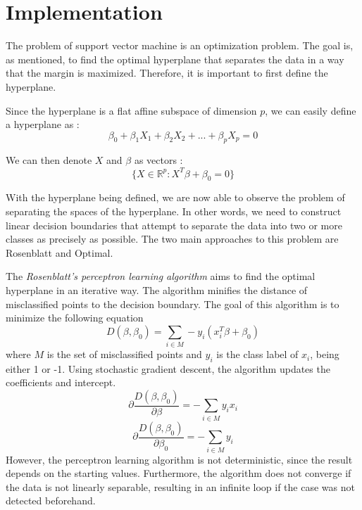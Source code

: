 \section{Implementation}
The problem of support vector machine is an optimization problem. The goal is, as mentioned, 
to find the optimal hyperplane that separates the data in a way that the margin is maximized.
Therefore, it is important to first define the hyperplane.

Since the hyperplane is a flat affine subspace of dimension $p$, we can easily define a hyperplane as \cite{R9}: 
\begin{equation}
    \beta_0 + \beta_1X_1 + \beta_2X_2 + ... + \beta_pX_p = 0
\end{equation}

We can then denote $X$ and $\beta$ as vectors \cite{Elements12}: 
\begin{equation}
    \{X \in \mathbb{R}^p: X^T \beta + \beta_0 = 0\}
\end{equation}

With the hyperplane being defined, we are now able to observe the problem of separating the spaces of the hyperplane. 
In other words, we need to construct linear decision
boundaries that attempt to separate the data into two or more classes as precisely as possible. 
The two main approaches to this problem are Rosenblatt and Optimal.

The \emph{Rosenblatt's perceptron learning algorithm} aims to find the optimal hyperplane in an iterative way. The algorithm minifies
the distance of misclassified points to the decision boundary. The goal of this algorithm is to minimize the following equation
\begin{equation}
    D(\beta, \beta_0) = \sum_{i\in M} -y_i(x_i^T \beta + \beta_0)
\end{equation}
where $M$ is the set of misclassified points and $y_i$ is the class label of $x_i$, being either 1 or -1. Using stochastic gradient
descent, the algorithm updates the coefficients and intercept. 
\begin{equation}
    \partial\frac{D(\beta, \beta_0)}{\partial\beta} = -\sum_{i\in M} y_ix_i
\end{equation}
\begin{equation}
    \partial\frac{D(\beta, \beta_0)}{\partial\beta_0} = -\sum_{i\in M} y_i
\end{equation}
However, the perceptron learning algorithm is not deterministic, since
the result depends on the starting values. Furthermore, the algorithm does not converge if the data is not linearly separable, resulting
in an infinite loop if the case was not detected beforehand. \cite{Elements4}

